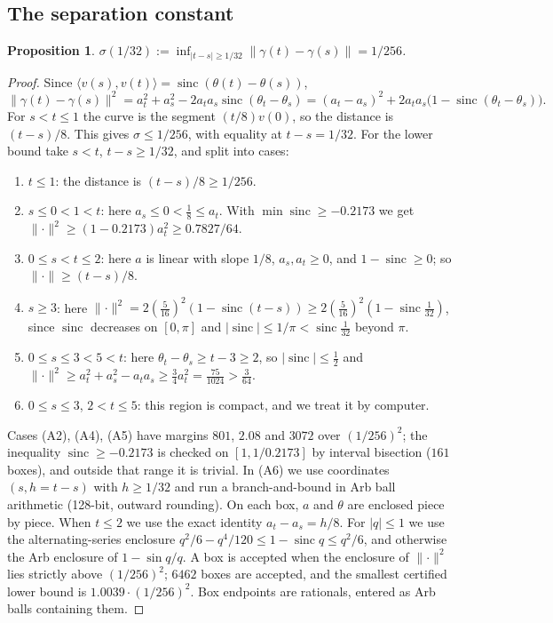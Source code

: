 \documentclass[11pt]{article}
\newtheorem{proposition}[theorem]{Proposition}
\theoremstyle{definition}
\theoremstyle{remark}
\newcommand{\norm}[1]{\lVert #1\rVert}
\newcommand{\ip}[2]{\langle #1,#2\rangle}
\begin{document}
\subsection{The separation constant}

\begin{proposition}\label{prop:sigma}
$\sigma(1/32):=\inf_{|t-s|\ge1/32}\norm{\gamma(t)-\gamma(s)}=1/256$.
\end{proposition}
\begin{proof}
Since $\ip{v(s)}{v(t)}=\operatorname{sinc}(\theta(t)-\theta(s))$,
\[
  \norm{\gamma(t)-\gamma(s)}^2=a_t^2+a_s^2-2a_ta_s\operatorname{sinc}(\theta_t-\theta_s)
  =(a_t-a_s)^2+2a_ta_s\bigl(1-\operatorname{sinc}(\theta_t-\theta_s)\bigr).
\]
For $s<t\le1$ the curve is the segment $(t/8)v(0)$, so the distance is $(t-s)/8$. This gives
$\sigma\le1/256$, with equality at $t-s=1/32$. For the lower bound take $s<t$, $t-s\ge1/32$, and
split into cases:
\begin{enumerate}
\item[(A1)] $t\le1$: the distance is $(t-s)/8\ge1/256$.
\item[(A2)] $s\le0<1<t$: here $a_s\le0<\frac18\le a_t$. With $\min\operatorname{sinc}\ge-0.2173$
  we get $\norm{\cdot}^2\ge(1-0.2173)a_t^2\ge0.7827/64$.
\item[(A3)] $0\le s<t\le2$: here $a$ is linear with slope $1/8$, $a_s,a_t\ge0$, and
  $1-\operatorname{sinc}\ge0$; so $\norm\cdot\ge(t-s)/8$.
\item[(A4)] $s\ge3$: here $\norm\cdot^2=2(\frac5{16})^2(1-\operatorname{sinc}(t-s))\ge
  2(\frac5{16})^2(1-\operatorname{sinc}\frac1{32})$, since $\operatorname{sinc}$ decreases on
  $[0,\pi]$ and $|\operatorname{sinc}|\le1/\pi<\operatorname{sinc}\frac1{32}$ beyond $\pi$.
\item[(A5)] $0\le s\le3<5<t$: here $\theta_t-\theta_s\ge t-3\ge2$, so $|\operatorname{sinc}|\le\frac12$
  and $\norm\cdot^2\ge a_t^2+a_s^2-a_ta_s\ge\frac34a_t^2=\frac{75}{1024}>\frac3{64}$.
\item[(A6)] $0\le s\le3$, $2<t\le5$: this region is compact, and we treat it by computer.
\end{enumerate}
Cases (A2), (A4), (A5) have margins $801$, $2.08$ and $3072$ over $(1/256)^2$; the
inequality $\operatorname{sinc}\ge-0.2173$ is checked on $[1,1/0.2173]$ by interval bisection
($161$ boxes), and outside that range it is trivial. In (A6) we use coordinates
$(s,h=t-s)$ with $h\ge1/32$ and run a branch-and-bound in Arb ball arithmetic (128-bit,
outward rounding). On each box, $a$ and $\theta$ are enclosed piece by piece. When $t\le2$ we use
the exact identity $a_t-a_s=h/8$. For $|q|\le1$ we use the alternating-series enclosure
$q^2/6-q^4/120\le1-\operatorname{sinc}q\le q^2/6$, and otherwise the Arb enclosure of
$1-\sin q/q$. A box is accepted when the enclosure of $\norm\cdot^2$ lies strictly above
$(1/256)^2$; $6462$ boxes are accepted, and the smallest certified lower bound is
$1.0039\cdot(1/256)^2$. Box endpoints are rationals, entered as Arb balls containing them.
\end{proof}
\end{document}
